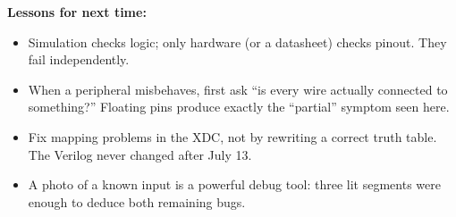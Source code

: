 \documentclass[11pt]{article}
\begin{document}
\textbf{Lessons for next time:}
\begin{itemize}
  \item Simulation checks logic; only hardware (or a datasheet) checks
    pinout. They fail independently.
  \item When a peripheral misbehaves, first ask ``is every wire actually
    connected to something?'' Floating pins produce exactly the
    ``partial'' symptom seen here.
  \item Fix mapping problems in the XDC, not by rewriting a correct
    truth table. The Verilog never changed after July 13.
  \item A photo of a known input is a powerful debug tool: three lit
    segments were enough to deduce both remaining bugs.
\end{itemize}
\end{document}
